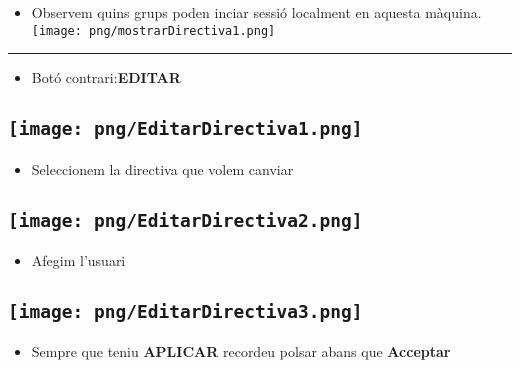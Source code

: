 \documentclass[
  a4paper,
]{article}
\providecommand{\tightlist}{%
  \setlength{\itemsep}{0pt}\setlength{\parskip}{0pt}}
\begin{document}
\begin{itemize}
\tightlist
\item
  Observem quins grups poden inciar sessió localment en aquesta màquina.
  \texttt{[image: png/mostrarDirectiva1.png]}
\end{itemize}

\begin{center}\rule{0.5\linewidth}{0.5pt}\end{center}

\begin{itemize}
\tightlist
\item
  Botó contrari:\textbf{EDITAR}
\end{itemize}

\subsection{\texorpdfstring{\protect\texttt{[image: png/EditarDirectiva1.png]}}{Figura 4: Edició de la directiva local de seguretat}}\label{figura-4-ediciuxf3-de-la-directiva-local-de-seguretat}

\begin{itemize}
\tightlist
\item
  Seleccionem la directiva que volem canviar
\end{itemize}

\subsection{\texorpdfstring{\protect\texttt{[image: png/EditarDirectiva2.png]}}{Figura 5: Edició de la directiva local de seguretat}}\label{figura-5-ediciuxf3-de-la-directiva-local-de-seguretat}

\begin{itemize}
\tightlist
\item
  Afegim l'usuari
\end{itemize}

\subsection{\texorpdfstring{\protect\texttt{[image: png/EditarDirectiva3.png]}}{Figura 6: Edició de la directiva local de seguretat}}\label{figura-6-ediciuxf3-de-la-directiva-local-de-seguretat}

\begin{itemize}
\tightlist
\item
  Sempre que teniu \textbf{APLICAR} recordeu polsar abans que
  \textbf{Acceptar}
\end{itemize}
\end{document}
